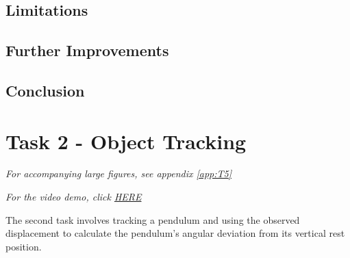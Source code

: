 \documentclass[conference]{IEEEtran}
\begin{document}

\subsection{Limitations}

%
%

\subsection{Further Improvements} \label{sec:further1}
 
\subsection{Conclusion}

\section{Task 2 - Object Tracking}
\textit{For accompanying large figures, see appendix \ref{app:T5}}

\textit{For the video demo, click \href{https://youtu.be/kW5fbNTTovo}{HERE}}

The second task involves tracking a pendulum and using the observed displacement to calculate the pendulum's angular deviation from its vertical rest position.
\end{document}
